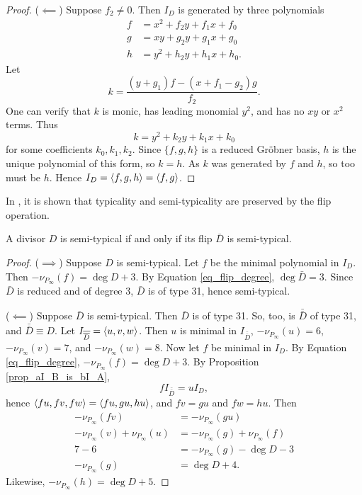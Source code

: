 \begin{proof}
  ($\impliedby$)
  Suppose $f_2 \neq 0$.
  Then $I_D$ is generated by three polynomials
  \begin{align*}
    f &= x^2 + f_2y + f_1x + f_0 \\
    g &= xy  + g_2y + g_1x + g_0 \\
    h &= y^2 + h_2y + h_1x + h_0.
  \end{align*}
  Let
  \[ k = \frac {(y + g_1)f - (x + f_1 - g_2)g} {f_2}. \]
  One can verify that $k$ is monic, has leading monomial $y^2$,
  and has no $xy$ or $x^2$ terms. Thus
  \[ k = y^2 + k_2y + k_1x + k_0 \]
  for some coefficients $k_0, k_1, k_2$.
  Since $\{f,g,h\}$ is a reduced Gr\"obner basis, $h$ is the unique polynomial of this form, so $k = h$.
  As $k$ was generated by $f$ and $h$, so too must be $h$.
  Hence $I_D = \left\langle f,g,h \right\rangle = \left\langle f,g \right\rangle$.
\end{proof}

In \cite{kmakdisi18}, it is shown that typicality and semi-typicality are preserved by the flip operation.
\begin{theorem}
  A divisor $D$ is semi-typical if and only if its flip $\bar D$ is semi-typical.
\end{theorem}
\begin{proof}
  ($\implies$)
  Suppose $D$ is semi-typical.
  Let $f$ be the minimal polynomial in $I_D$.
  Then $-\nu_{P_\infty}(f) = \deg D + 3$.
  By Equation \ref{eq_flip_degree}, $\deg \bar D = 3$.
  Since $\bar D$ is reduced and of degree 3, $\bar D$ is of type 31, hence semi-typical.
  
  ($\impliedby$)
  Suppose $\bar D$ is semi-typical.
  Then $\bar D$ is of type 31.
  So, too, is $\bar{\bar D}$ of type 31, and $\bar{\bar D} \equiv D$.
  Let $I_{\overline {\overline D}} = \left\langle u,v,w \right\rangle$.
  Then $u$ is minimal in $I_{\bar{\bar D}}$,
  $-\nu_{P_\infty}(u) = 6$, $-\nu_{P_\infty}(v) = 7$, and $-\nu_{P_\infty}(w) = 8$.
  Now let $f$ be minimal in $I_D$.
  By Equation \ref{eq_flip_degree}, $-\nu_{P_\infty}(f) = \deg D + 3$.
  By Proposition \ref{prop_aI_B_is_bI_A},
  \[ fI_{\bar{\bar D}} = uI_D, \]
  hence $\left\langle fu, fv, fw \right\rangle = \left\langle fu, gu, hu \right\rangle$, and $fv = gu$ and $fw = hu$.
  Then
  \begin{align*}
    -\nu_{P_\infty}(fv) &= -\nu_{P_\infty}(gu) \\
    -\nu_{P_\infty}(v) + \nu_{P_\infty}(u) &= -\nu_{P_\infty}(g) + \nu_{P_\infty}(f) \\
    7 - 6 &= -\nu_{P_\infty}(g) - \deg D - 3\\
    -\nu_{P_\infty}(g) &=  \deg D + 4.
  \end{align*}
  Likewise, $-\nu_{P_\infty}(h) =  \deg D + 5$.
\end{proof}

